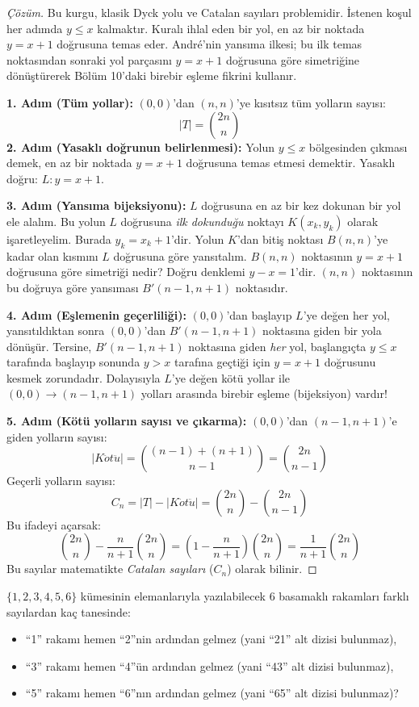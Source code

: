 \begin{proof}[Çözüm]
Bu kurgu, klasik Dyck yolu ve Catalan sayıları problemidir. İstenen koşul her adımda $y \le x$ kalmaktır. Kuralı ihlal eden bir yol, en az bir noktada $y = x + 1$ doğrusuna temas eder. André'nin yansıma ilkesi; bu ilk temas noktasından sonraki yol parçasını $y = x + 1$ doğrusuna göre simetriğine dönüştürerek Bölüm 10'daki birebir eşleme fikrini kullanır.

\textbf{1. Adım (Tüm yollar):}
$(0,0)$'dan $(n,n)$'ye kısıtsız tüm yolların sayısı:
\[
|T| = \binom{2n}{n}
\]
\textbf{2. Adım (Yasaklı doğrunun belirlenmesi):}
Yolun $y \le x$ bölgesinden çıkması demek, en az bir noktada $y = x + 1$ doğrusuna temas etmesi demektir.
Yasaklı doğru: $L: y = x + 1$.

\textbf{3. Adım (Yansıma bijeksiyonu):}
$L$ doğrusuna en az bir kez dokunan bir yol ele alalım. Bu yolun $L$ doğrusuna \emph{ilk dokunduğu} noktayı $K(x_k, y_k)$ olarak işaretleyelim. Burada $y_k = x_k + 1$'dir.
Yolun $K$'dan bitiş noktası $B(n,n)$'ye kadar olan kısmını $L$ doğrusuna göre yansıtalım.
$B(n,n)$ noktasının $y = x + 1$ doğrusuna göre simetriği nedir?
Doğru denklemi $y - x = 1$'dir. $(n, n)$ noktasının bu doğruya göre yansıması $B'(n-1, n+1)$ noktasıdır.

\textbf{4. Adım (Eşlemenin geçerliliği):}
$(0,0)$'dan başlayıp $L$'ye değen her yol, yansıtıldıktan sonra $(0,0)$'dan $B'(n-1, n+1)$ noktasına giden bir yola dönüşür.
Tersine, $B'(n-1, n+1)$ noktasına giden \emph{her} yol, başlangıçta $y \le x$ tarafında başlayıp sonunda $y > x$ tarafına geçtiği için $y = x + 1$ doğrusunu kesmek zorundadır.
Dolayısıyla $L$'ye değen kötü yollar ile $(0,0) \to (n-1, n+1)$ yolları arasında birebir eşleme (bijeksiyon) vardır!

\textbf{5. Adım (Kötü yolların sayısı ve çıkarma):}
$(0,0)$'dan $(n-1, n+1)$'e giden yolların sayısı:
\[
|K\ddot{o}t\ddot{u}| = \binom{(n-1) + (n+1)}{n-1} = \binom{2n}{n-1}
\]
Geçerli yolların sayısı:
\[
C_n = |T| - |K\ddot{o}t\ddot{u}| = \binom{2n}{n} - \binom{2n}{n-1}
\]
Bu ifadeyi açarsak:
\[
\binom{2n}{n} - \frac{n}{n+1}\binom{2n}{n} = \left(1 - \frac{n}{n+1}\right)\binom{2n}{n} = \frac{1}{n+1}\binom{2n}{n}
\]
Bu sayılar matematikte \emph{Catalan sayıları} ($C_n$) olarak bilinir.
\end{proof}

\begin{example}
$\{1, 2, 3, 4, 5, 6\}$ kümesinin elemanlarıyla yazılabilecek 6 basamaklı rakamları farklı sayılardan kaç tanesinde:
\begin{itemize}
    \item ``1'' rakamı hemen ``2''nin ardından gelmez (yani ``21'' alt dizisi bulunmaz),
    \item ``3'' rakamı hemen ``4''ün ardından gelmez (yani ``43'' alt dizisi bulunmaz),
    \item ``5'' rakamı hemen ``6''nın ardından gelmez (yani ``65'' alt dizisi bulunmaz)?
\end{itemize}
\end{example}

